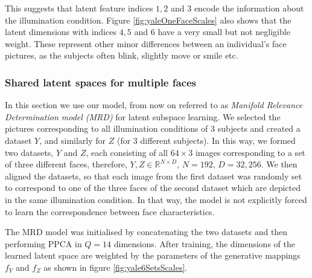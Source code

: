 This suggests that latent feature indices $1,2$ and $3$ encode the information about the illumination condition.
Figure \ref{fig:yaleOneFaceScales} also shows that the latent dimensions with indices $4,5$ and $6$ have a very small but not negligible weight.
These represent other minor differences between an individual's face pictures, as the subjects
often blink, slightly move or smile etc. 



\subsubsection{Shared latent spaces for multiple faces}

In this section we use our model, from now on referred to as \emph{Manifold Relevance Determination model (MRD)} for latent subspace learning. 
We selected the pictures corresponding to all illumination conditions of $3$ subjects and created a dataset $Y$, and similarly
for $Z$ (for $3$ different subjects).
In this way, we formed two datasets, $Y$ and $Z$, each consisting of all $64 \times 3$ images corresponding to
a set of three different faces, therefore, $Y, Z \in \mathbb{R}^{N \times D}$, $N = 192$, $D = 32,256$.
 We then aligned the datasets, so that each image from the
first dataset was randomly set to correspond to one of the three faces of the second dataset which are depicted in the same illumination condition. In that way, the model is not
explicitly forced to learn the correspondence between face characteristics.

\par The MRD model was initialised by concatenating the two datasets and then performing PPCA in $Q=14$ dimensions. After training, 
the dimensions of the learned latent space are weighted by the parameters of the generative mappings $f_Y$ and $f_Z$ as shown in figure \ref{fig:yale6SetsScales}.

